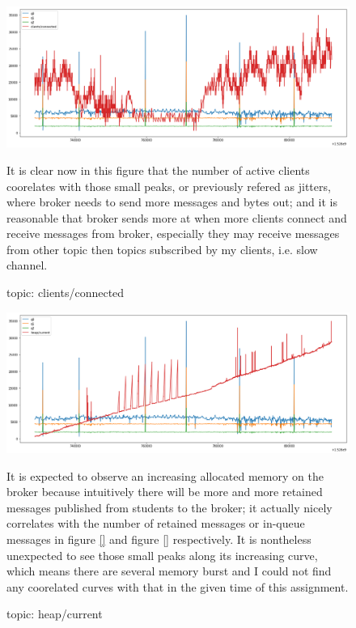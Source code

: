 \documentclass[12pt, letterpaper]{article}
\begin{document}
\begin{figure}
	\setlength{\tabcolsep}{0pt}
	\caption{topic: clients/connected}
	\label{f:valid_cnt_clients_connected}
	\begin{center}
		\includegraphics[width=\textwidth]{valid_cnt/valid_cnt-clients_connected}	
	\end{center}
	It is clear now in this figure that the number of active clients coorelates with those small peaks, or previously refered as jitters, where broker needs to send more messages and bytes out; and it is reasonable that broker sends more at when more clients connect and receive messages from broker, especially they may receive messages from other topic then topics subscribed by my clients, i.e. slow channel.
\end{figure}

\begin{figure}
	\setlength{\tabcolsep}{0pt}
	\caption{topic: heap/current}
	\label{f:valid_cnt_heap_current}
	\begin{center}
		\includegraphics[width=\textwidth]{valid_cnt/valid_cnt-heap_current}	
	\end{center}
	It is expected to observe an increasing allocated memory on the broker because intuitively there will be more and more retained messages published from students to the broker; it actually nicely correlates with the number of retained messages or in-queue messages in figure \ref{} and figure \ref{} respectively. It is nontheless unexpected to see those small peaks along its increasing curve, which means there are several memory burst and I could not find any coorelated curves with that in the given time of this assignment.
\end{figure}
\end{document}
